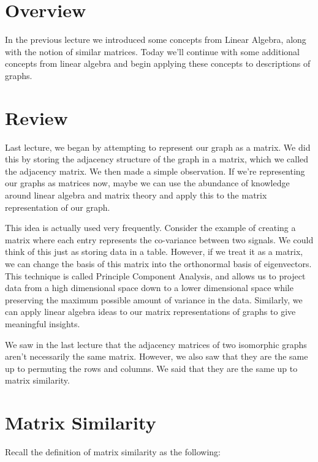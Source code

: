 \documentclass{article}
\begin{document}
    
    \section{Overview}
    In the previous lecture we introduced some concepts from Linear Algebra, along with the notion of similar matrices. Today we'll continue with some additional concepts from linear algebra and begin applying these concepts to descriptions of graphs.
    
    \section{Review}
    Last lecture, we began by attempting to represent our graph as a matrix. We did this by storing the adjacency structure of the graph in a matrix, which we called the adjacency matrix. We then made a simple observation. If we're representing our graphs as matrices now, maybe we can use the abundance of knowledge around linear algebra and matrix theory and apply this to the matrix representation of our graph. 
    
    This idea is actually used very frequently. Consider the example of creating a matrix where each entry represents the co-variance between two signals. We could think of this just as storing data in a table. However, if we treat it as a matrix, we can change the basis of this matrix into the orthonormal basis of eigenvectors. This technique is called Principle Component Analysis, and allows us to project data from a high dimensional space down to a lower dimensional space while preserving the maximum possible amount of variance in the data. Similarly, we can apply linear algebra ideas to our matrix representations of graphs to give meaningful insights.
    
    We saw in the last lecture that the adjacency matrices of two isomorphic graphs aren't necessarily the same matrix. However, we also saw that they are the same up to permuting the rows and columns. We  said that they are the same up to matrix similarity.
    
    \section{Matrix Similarity}
    
    Recall the definition of matrix similarity as the following:
    
\end{document}
